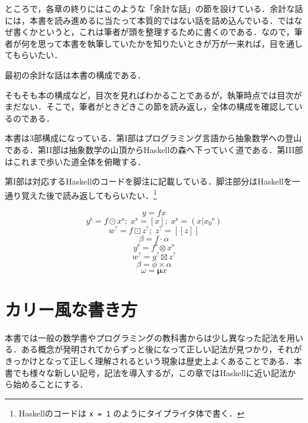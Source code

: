 \documentclass[a4paper,draft]{jsbook}
\def\[{\left[\!\left[}
\def\]{\right]\!\right]}
\newcommand{\programminglanguage}[1]{\textsf{#1}}
\newcommand{\haskell}{\programminglanguage{Haskell}}
\newenvironment{leader}{\begingroup}{\endgroup}
\newcommand{\code}[1]{\texttt{#1}}
\newcommand{\mType}[1]{\mathbf{#1}}
\newcommand{\mListType}[1]{[\mType{#1}]}
\newcommand{\mMaybeType}[1]{\[\mType{#1}\]}
\newcommand{\mTypeConstructor}[1]{\mathit{#1}} %
\newcommand{\mListOf}[1]{\left[#1\right]}
\newcommand{\mMaybeOf}[1]{\[#1\]}
\newcommand{\mListVar}[1]{{#1}^\mathrm{s}}
\newcommand{\mMaybeVar}[1]{{#1}^\text{?}}
\DeclareMathOperator{\mMap}{\cdot}
\DeclareMathOperator{\mMapList}{\odot}
\DeclareMathOperator{\mMapMaybe}{\boxdot}
\DeclareMathOperator{\mApplicativeMap}{\times}
\DeclareMathOperator{\mApplicativeMapList}{\otimes}
\DeclareMathOperator{\mApplicativeMapMaybe}{\boxtimes}
\DeclareMathOperator{\mListTypeConstructor}{\mTypeConstructor{List}}
\DeclareMathOperator{\mMaybeTypeConstructor}{\mTypeConstructor{Maybe}}
\begin{document}
ところで，各章の終りにはこのような「余計な話」の節を設けている．余計な話には，本書を読み進めるに当たって本質的ではない話を詰め込んでいる．ではなぜ書くかというと，これは筆者が頭を整理するために書くのである．なので，筆者が何を思って本書を執筆していたかを知りたいときが万が一来れば，目を通してもらいたい．

最初の余計な話は本書の構成である．

そもそも本の構成など，目次を見ればわかることであるが，執筆時点では目次がまだない．そこで，筆者がときどきこの節を読み返し，全体の構成を確認しているのである．

本書は3部構成になっている．第I部はプログラミング言語から抽象数学への登山である．第II部は抽象数学の山頂から\haskell の森へ下っていく道である．第III部はこれまで歩いた道全体を俯瞰する．

第I部は対応する\haskell のコードを脚注に記載している．脚注部分は\haskell を一通り覚えた後で読み返してもらいたい．\footnote{\haskell のコードは \code{x = 1} のようにタイプライタ体で書く．}

% 




$$y=fx$$
$$\mListVar{y}=f\mMapList\mListVar{x};\;
\mListVar{x}=\mListOf{x};\;
\mListVar{x}=(x|\mListVar{x_0})$$
$$\mMaybeVar{w}=f\mMapMaybe\mMaybeVar{z};\;
\mMaybeVar{z}=\mMaybeOf{z}$$
$$\beta=f\mMap\alpha$$
$$\mListVar{y}=\mListVar{f}\mApplicativeMapList\mListVar{x}$$
$$\mMaybeVar{w}=\mMaybeVar{g}\mApplicativeMapMaybe\mMaybeVar{z}$$
$$\beta=\phi\mApplicativeMap\alpha$$
$$\omega={\boldsymbol\mu}x$$


\chapter{カリー風な書き方}
\begin{leader}
本書では一般の数学書やプログラミングの教科書からは少し異なった記法を用いる．ある概念が発明されてからずっと後になって正しい記法が見つかり，それがきっかけとなって正しく理解されるという現象は歴史上よくあることである．本書でも様々な新しい記号，記法を導入するが，この章では\haskell に近い記法から始めることにする．
\end{leader}
\end{document}
